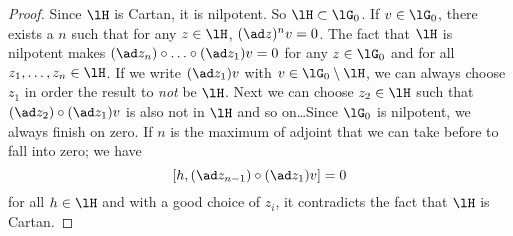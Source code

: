 \begin{proof}
	Since $\lH$ is Cartan, it is nilpotent. So $\lH\subset\lG_0$. If $v\in\lG_0$, there exists a $n$ such that for any $z\in\lH$, $(\ad z)^nv=0$. The fact that $\lH$ is nilpotent makes $(\ad z_n)\circ\ldots\circ(\ad z_1)v=0$ for any $z\in\lG_0$ and for all $z_1,\ldots,z_n\in\lH$. If we write $(\ad z_1)v$ with $v\in\lG_0\setminus\lH$, we can always choose $z_1$ in order the result to \emph{not} be $\lH$. Next we can choose $z_2\in\lH$ such that $(\ad z_2)\circ(\ad z_1)v$ is also not in $\lH$ and so on\ldots Since $\lG_0$ is nilpotent, we always finish on zero. If $n$ is the maximum of adjoint that we can take before to fall into zero; we have
	\[
		[h, (\ad z_{n-1})\circ(\ad z_1)v ]=0
	\]
	for all $h\in\lH$ and with a good choice of $z_i$, it contradicts the fact that $\lH$ is Cartan.
\end{proof}
